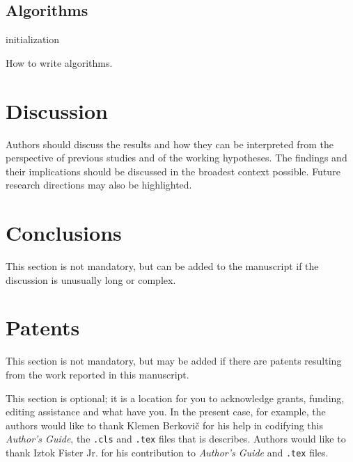 \documentclass[article,english]{stucosrec}
\newcommand{\latexe}{\LaTeX$2_\epsilon$\xspace}
\begin{document}
    \subsection{Algorithms}
    
    \begin{algorithm}
		\SetAlgoLined
		\KwResult{how to write algorithm with \latexe}
		initialization\;
		\caption{How to write algorithms.}
		\label{algo:sample}
	\end{algorithm}
    
    \section{Discussion}
    
    Authors should discuss the results and how they can be interpreted from the perspective of previous studies and of the working hypotheses.
    The findings and their implications should be discussed in the broadest context possible.
    Future research directions may also be highlighted.
    
    \section{Conclusions}
    
    This section is not mandatory, but can be added to the manuscript if the discussion is unusually long or complex.
    
    \section{Patents}
    
    This section is not mandatory, but may be added if there are patents resulting from the work reported in this manuscript.
    
    \begin{acknowledgment}
		This section is optional; it is a location for you to acknowledge grants, funding, editing assistance and what have you.
		In the present case, for example, the authors would like to thank Klemen Berkovič for his help in codifying this \textit{Author's Guide}, the \texttt{.cls} and \texttt{.tex} files that is describes. Authors would like to thank Iztok Fister Jr. for his contribution to \textit{Author's Guide} and \texttt{.tex} files.
	\end{acknowledgment}
    
    
    
\end{document}

